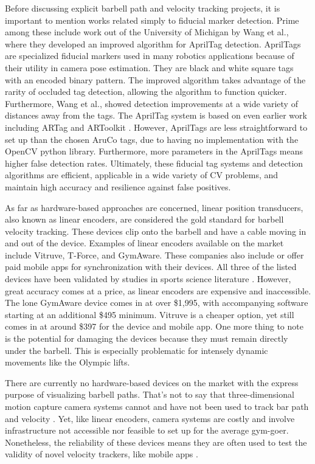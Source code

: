 \documentclass[10pt,twocolumn]{article}
\begin{document}
Before discussing explicit barbell path and velocity tracking projects, it is important to mention works related simply to fiducial marker detection. 
Prime among these include work out of the University of Michigan by Wang et al., where they developed an improved algorithm for AprilTag detection. 
AprilTags are specialized fiducial markers used in many robotics applications because of their utility in camera pose estimation. 
They are black and white square tags with an encoded binary pattern. 
The improved algorithm takes advantage of the rarity of occluded tag detection, allowing the algorithm to function quicker. 
Furthermore, Wang et al., showed detection improvements at a wide variety of distances away from the tags. 
The AprilTag system is based on even earlier work including ARTag and ARToolkit \cite{Kato1999,Fiala2005}. 
However, AprilTags are less straightforward to set up than the chosen AruCo tags, due to having no implementation with the OpenCV python library.
Furthermore, more parameters in the AprilTags means higher false detection rates.
Ultimately, these fiducial tag systems and detection algorithms are efficient, applicable in a wide variety of CV problems, and maintain high accuracy and resilience against false positives. \par

As far as hardware-based approaches are concerned, linear position transducers, also known as linear encoders, are considered the gold standard for barbell velocity tracking.
These devices clip onto the barbell and have a cable moving in and out of the device.
Examples of linear encoders available on the market include Vitruve, T-Force, and GymAware. 
These companies also include or offer paid mobile apps for synchronization with their devices.
All three of the listed devices have been validated by studies in sports science literature \cite{Martinez-Cava2020, Wadhi2018, PerezCastilla2019}.
However, great accuracy comes at a price, as linear encoders are expensive and inaccessible.
The lone GymAware device comes in at over \$1,995, with accompanying software starting at an additional \$495 minimum.
Vitruve is a cheaper option, yet still comes in at around \$397 for the device and mobile app. 
One more thing to note is the potential for damaging the devices because they must remain directly under the barbell.
This is especially problematic for intensely dynamic movements like the Olympic lifts.\par

There are currently no hardware-based devices on the market with the express purpose of visualizing barbell paths.
That's not to say that three-dimensional motion capture camera systems cannot and have not been used to track bar path and velocity \cite{PerezCastilla2019}.
Yet, like linear encoders, camera systems are costly and involve infrastructure not accessible nor feasible to set up for the average gym-goer.
Nonetheless, the reliability of these devices means they are often used to test the validity of novel velocity trackers, like mobile apps \cite{PerezCastilla2019}. \par
\end{document}
